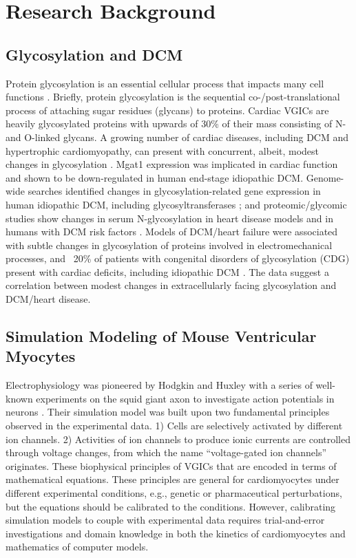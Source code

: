 \documentclass[journal]{IEEEtran}
\begin{document}
\section{Research Background}
\subsection{Glycosylation and DCM}
Protein glycosylation is an essential cellular process that impacts many cell functions \cite{marques2017cardiac}. Briefly, protein glycosylation is the sequential co-/post-translational process of attaching sugar residues (glycans) to proteins. Cardiac VGICs are heavily glycosylated proteins with upwards of 30\% of their mass consisting of N- and O-linked glycans. A growing number of cardiac diseases, including DCM and hypertrophic cardiomyopathy, can present with concurrent, albeit, modest changes in glycosylation \cite{gehrmann2003cardiomyopathy, footitt2009cardiomyopathy, marques2017cardiac}. Mgat1 expression was implicated in cardiac function and shown to be down-regulated in human end-stage idiopathic DCM. Genome-wide searches identified changes in glycosylation-related gene expression in human idiopathic DCM, including glycosyltransferases \cite{barrans2002global, hwang2002microarray, yung2004gene}; and proteomic/glycomic studies show changes in serum N-glycosylation in heart disease models and in humans with DCM risk factors \cite{nishio1995identification, knezevic2009variability, miura2016glycomics, nagai2016aberrant, yang2015glycoproteins}. Models of DCM/heart failure were associated with subtle changes in glycosylation of proteins involved in electromechanical processes, and ~20\% of patients with congenital disorders of glycosylation (CDG) present with cardiac deficits, including idiopathic DCM \cite{gehrmann2003cardiomyopathy, marques2017cardiac}. The data suggest a correlation between modest changes in extracellularly facing glycosylation and DCM/heart disease. 

\subsection{Simulation Modeling of Mouse Ventricular Myocytes}
Electrophysiology was pioneered by Hodgkin and Huxley with a series of well-known experiments on the squid giant axon to investigate action potentials in neurons \cite{hodgkin1952quantitative}. Their simulation model was built upon two fundamental principles observed in the experimental data. 1) Cells are selectively activated by different ion channels. 2) Activities of ion channels to produce ionic currents are controlled through voltage changes, from which the name ``voltage-gated ion channels'' originates. These biophysical principles of VGICs that are encoded in terms of mathematical equations. These principles are general for cardiomyocytes under different experimental conditions, e.g., genetic or pharmaceutical perturbations, but the equations should be calibrated to the conditions. However, calibrating simulation models to couple with experimental data requires trial-and-error investigations and domain knowledge in both the kinetics of cardiomyocytes and mathematics of computer models.
\end{document}
